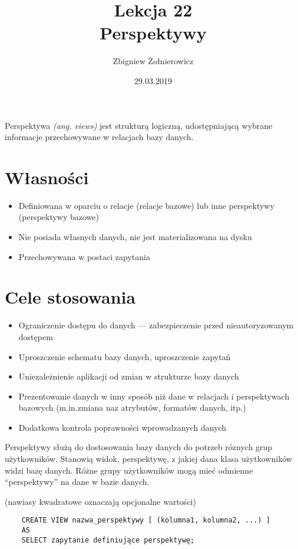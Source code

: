 \documentclass[a4paper]{article}
\begin{document}
\title{{\huge Lekcja 22} \\
{\large Perspektywy}}
\author{Zbigniew Żołnierowicz}
\date{29.03.2019}
\maketitle
Perspektywa \emph{(ang. views)} jest strukturą logiczną, udostępniającą wybrane informacje przechowywane w relacjach bazy danych.

\section{Własności}

\begin{itemize}
    \item Definiowana w oparciu o relacje (relacje bazowe) lub inne perspektywy (perspektywy bazowe)
    \item Nie posiada własnych danych, nie jest materializowana na dysku
    \item Przechowywana w postaci zapytania
\end{itemize}

\section{Cele stosowania}

\begin{itemize}
    \item Ograniczenie dostępu do danych --- zabezpieczenie przed nieautoryzowanym dostępem
    \item Uproszczenie schematu bazy danych, uproszczenie zapytań
    \item Uniezależnienie aplikacji od zmian w strukturze bazy danych
    \item Prezentowanie danych w inny sposób niż dane w relacjach i perspektywach bazowych (m.in.\@ zmiana naz atrybutów, formatów danych, itp.)
    \item Dodatkowa kontrola poprawności wprowadzanych danych
\end{itemize}

Perspektywy służą do dostosowania bazy danych do potrzeb róznych grup użytkowników.
Stanowią widok, perspektywę, z jakiej dana klasa użytkowników widzi bazę danych.
Różne grupy użytkowników mogą mieć odmienne ``perspektywy'' na dane w bazie danych.
\pagebreak

(nawiasy kwadratowe oznaczają opcjonalne wartości)

\begin{verbatim}
    CREATE VIEW nazwa_perspektywy [ (kolumna1, kolumna2, ...) ]
    AS
    SELECT zapytanie definiujące perspektywę;
\end{verbatim}
\end{document}
